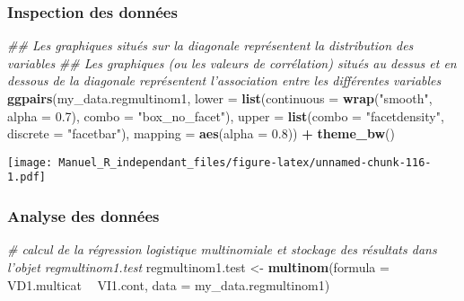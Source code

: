 \documentclass[
]{book}
\newenvironment{Shaded}{\begin{snugshade}}{\end{snugshade}}
\newcommand{\CommentTok}[1]{\textcolor[rgb]{0.56,0.35,0.01}{\textit{#1}}}
\newcommand{\DataTypeTok}[1]{\textcolor[rgb]{0.13,0.29,0.53}{#1}}
\newcommand{\FloatTok}[1]{\textcolor[rgb]{0.00,0.00,0.81}{#1}}
\newcommand{\KeywordTok}[1]{\textcolor[rgb]{0.13,0.29,0.53}{\textbf{#1}}}
\newcommand{\NormalTok}[1]{#1}
\newcommand{\OperatorTok}[1]{\textcolor[rgb]{0.81,0.36,0.00}{\textbf{#1}}}
\newcommand{\StringTok}[1]{\textcolor[rgb]{0.31,0.60,0.02}{#1}}
\begin{document}
\hypertarget{inspection-des-donnuxe9es-12}{%
\subsubsection{Inspection des données}\label{inspection-des-donnuxe9es-12}}

\begin{Shaded}
\begin{Highlighting}[]
\CommentTok{## Les graphiques situés sur la diagonale représentent la distribution des variables}
\CommentTok{## Les graphiques (ou les valeurs de corrélation) situés au dessus et en dessous de la diagonale représentent l'association entre les différentes variables}
\KeywordTok{ggpairs}\NormalTok{(my_data.regmultinom1,}
        \DataTypeTok{lower =} \KeywordTok{list}\NormalTok{(}\DataTypeTok{continuous =} \KeywordTok{wrap}\NormalTok{(}\StringTok{"smooth"}\NormalTok{, }\DataTypeTok{alpha =} \FloatTok{0.7}\NormalTok{), }\DataTypeTok{combo =} \StringTok{"box_no_facet"}\NormalTok{),}
        \DataTypeTok{upper =} \KeywordTok{list}\NormalTok{(}\DataTypeTok{combo =} \StringTok{"facetdensity"}\NormalTok{, }\DataTypeTok{discrete =} \StringTok{"facetbar"}\NormalTok{), }
        \DataTypeTok{mapping =} \KeywordTok{aes}\NormalTok{(}\DataTypeTok{alpha =} \FloatTok{0.8}\NormalTok{)) }\OperatorTok{+}\StringTok{ }\KeywordTok{theme_bw}\NormalTok{()}
\end{Highlighting}
\end{Shaded}

\texttt{[image: Manuel\_R\_independant\_files/figure-latex/unnamed-chunk-116-1.pdf]}

\hypertarget{analyse-des-donnuxe9es-13}{%
\subsubsection{Analyse des données}\label{analyse-des-donnuxe9es-13}}

\begin{Shaded}
\begin{Highlighting}[]
\CommentTok{# calcul de la régression logistique multinomiale et stockage des résultats dans l’objet regmultinom1.test}
\NormalTok{regmultinom1.test <-}\StringTok{ }\KeywordTok{multinom}\NormalTok{(}\DataTypeTok{formula =}\NormalTok{ VD1.multicat }\OperatorTok{~}\StringTok{ }\NormalTok{VI1.cont, }
                              \DataTypeTok{data =}\NormalTok{ my_data.regmultinom1)}
\end{Highlighting}
\end{Shaded}
\end{document}
